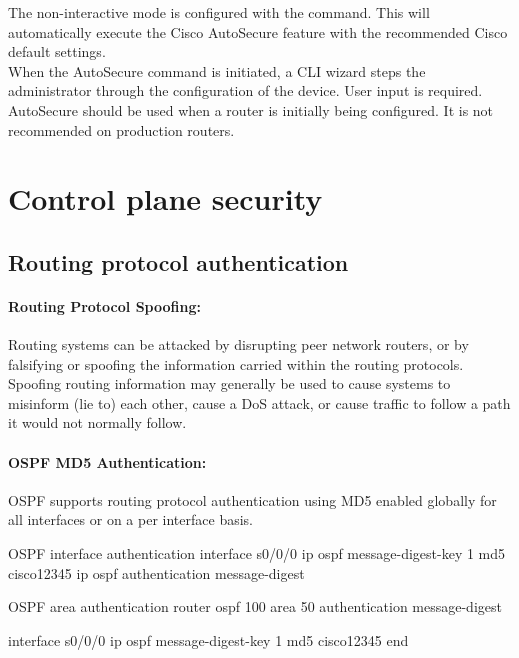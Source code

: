 The non-interactive mode is configured with the  command. This will automatically execute the Cisco AutoSecure feature with the recommended Cisco default settings. \\

When the AutoSecure command is initiated, a CLI wizard steps the administrator through the configuration of the device. User input is required. AutoSecure should be used when a router is initially being configured. It is not recommended on production routers.

\section{Control plane security}

\subsection{Routing protocol authentication}

\paragraph{Routing Protocol Spoofing:} Routing systems can be attacked by disrupting peer network routers, or by falsifying or spoofing the information carried within the routing protocols. Spoofing routing information may generally be used to cause systems to misinform (lie to) each other, cause a DoS attack, or cause traffic to follow a path it would not normally follow. 

\paragraph{OSPF MD5 Authentication:} OSPF supports routing protocol authentication using MD5  enabled globally for all interfaces or on a per interface basis.

\begin{sexylisting}{OSPF interface authentication}
interface s0/0/0
  ip ospf message-digest-key 1 md5 cisco12345
  ip ospf authentication message-digest
\end{sexylisting}

\begin{sexylisting}{OSPF area authentication}
router ospf 100
  area 50 authentication message-digest

interface s0/0/0
  ip ospf message-digest-key 1 md5 cisco12345
end
\end{sexylisting}

